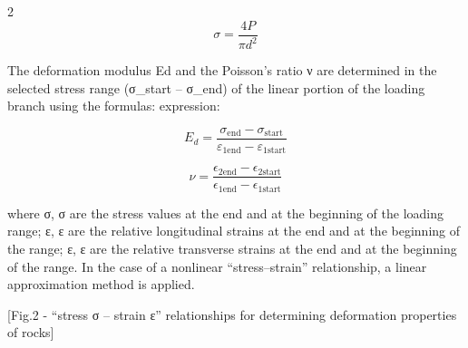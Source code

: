 \begin{multicols}{2}
\begin{equation*}
\sigma = \frac{4P}{\pi d^{2}}
\end{equation*}

The deformation modulus Ed and the Poisson's ratio ν are determined in
the selected stress range (σ\_start -- σ\_end) of the linear portion of
the loading branch using the formulas:
expression:

\begin{equation*}
E_{d} = \frac{\sigma_{\text{end}} - \sigma_{\text{start}}}{\varepsilon_{1\text{end}} - \varepsilon_{1\text{start}}}
\end{equation*}

\begin{equation*}
\nu = \frac{\epsilon_{2\text{end}} - \epsilon_{2\text{start}}}{\epsilon_{1\text{end}} - \epsilon_{1\text{start}}}
\end{equation*}

where σ, σ are the stress values
at the end and at the beginning of the loading range;
ε, ε are the relative
longitudinal strains at the end and at the beginning of the range;
ε, ε are the relative
transverse strains at the end and at the beginning of the range. In the
case of a nonlinear ``stress--strain'' relationship, a linear
approximation method is applied.
\end{multicols}

[Fig.2 - ``stress σ -- strain ε'' relationships for determining
deformation properties of rocks]

